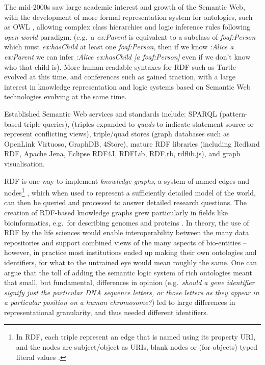 The mid-2000s saw large academic interest and growth of the Semantic Web, with the development of more formal representation system for ontologies, such as OWL \cite{w3-owl2-overview}, allowing complex class hierarchies and logic inference rules following \emph{open world} paradigm. (e.g.~a \emph{ex:Parent} is equivalent to a subclass of \emph{foaf:Person} which must \emph{ex:hasChild} at least one \emph{foaf:Person}, then if we know \emph{:Alice a ex:Parent} we can infer \emph{:Alice ex:hasChild {[}a foaf:Person{]}} even if we don't know who that child is). More human-readable syntaxes for RDF such as Turtle evolved at this time, and conferences such as  \cite{horrocksSemanticWebISWC2002} gained traction, with a large interest in knowledge representation and logic systems based on Semantic Web technologies evolving at the same time.

Established Semantic Web services and standards include: SPARQL \cite{w3-sparql11-overview} (pattern-based triple queries),  \cite{w3-rdf11-concepts} (triples expanded to \emph{quads} to indicate statement source or represent conflicting views), triple/quad stores (graph databases such as OpenLink Virtuoso, GraphDB, 4Store), mature RDF libraries (including Redland RDF, Apache Jena, Eclipse RDF4J, RDFLib, RDF.rb, rdflib.js), and graph visualisation.

RDF is one way to implement \emph{knowledge graphs}, a system of named edges and nodes\footnote{In RDF, each triple represent an edge that is named using its property URI, and the nodes are subject/object as URIs, blank nodes or (for objects) typed literal values \cite{w3-rdf11-primer}.} \cite{nurdiati2008}, which when used to represent a sufficiently detailed model of the world, can then be queried and processed to answer detailed research questions. The creation of RDF-based knowledge graphs grew particularly in fields like bioinformatics, e.g.~for describing genomes and proteins \cite{gobleStateNationData2008c,williamsOpenPHACTSSemantic2012c}. In theory, the use of RDF by the life sciences would enable interoperability between the many data repositories and support combined views of the many aspects of bio-entities -- however, in practice most institutions ended up making their own ontologies and identifiers, for what to the untrained eye would mean roughly the same. One can argue that the toll of adding the semantic logic system of rich ontologies meant that small, but fundamental, differences in opinion (e.g.~\emph{should a gene identifier signify just the particular DNA sequence letters, or those letters as they appear in a particular position on a human chromosome?}) led to large differences in representational granularity, and thus needed different identifiers.

